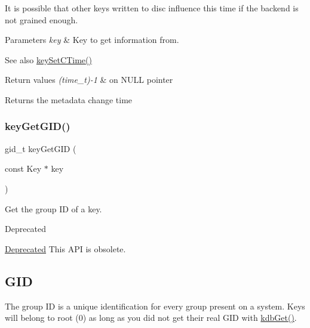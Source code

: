 It is possible that other keys written to disc influence this time if the backend is not grained enough.


\begin{DoxyParams}{Parameters}
{\em key} & Key to get information from. \\
\hline
\end{DoxyParams}
\begin{DoxySeeAlso}{See also}
\mbox{\hyperlink{group__meta_ga9f502ecab8ab43f0b17220fcc95f3fa5}{key\+Set\+C\+Time()}} 
\end{DoxySeeAlso}

\begin{DoxyRetVals}{Return values}
{\em (time\+\_\+t)-\/1} & on N\+U\+LL pointer \\
\hline
\end{DoxyRetVals}
\begin{DoxyReturn}{Returns}
the metadata change time 
\end{DoxyReturn}
\mbox{\label{group__meta_ga46a95e81d7d7f4e3eb59e60e5f3738c0}} 
\subsubsection{\texorpdfstring{keyGetGID()}{keyGetGID()}}
{\footnotesize\ttfamily gid\+\_\+t key\+Get\+G\+ID (\begin{DoxyParamCaption}\item[{const Key $\ast$}]{key }\end{DoxyParamCaption})}



Get the group ID of a key. 

\begin{DoxyRefDesc}{Deprecated}
\item[\mbox{\hyperlink{deprecated__deprecated000016}{Deprecated}}]This A\+PI is obsolete.\end{DoxyRefDesc}
\hypertarget{group__meta_GID}{}\subsection{G\+ID}\label{group__meta_GID}
The group ID is a unique identification for every group present on a system. Keys will belong to root (0) as long as you did not get their real G\+ID with \mbox{\hyperlink{group__kdb_ga28e385fd9cb7ccfe0b2f1ed2f62453a1}{kdb\+Get()}}.

